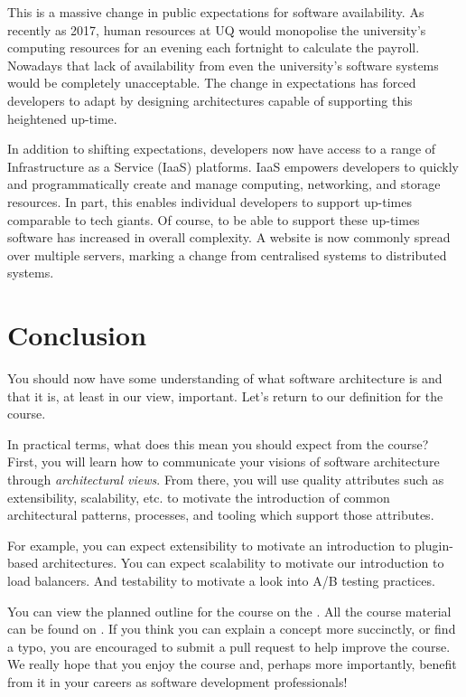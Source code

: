 This is a massive change in public expectations for software availability.
As recently as 2017, human resources at UQ would monopolise the university's computing resources for an evening each fortnight to calculate the payroll.
Nowadays that lack of availability from even the university's software systems would be completely unacceptable.
The change in expectations has forced developers to adapt by designing architectures capable of supporting this heightened up-time.

In addition to shifting expectations, developers now have access to a range of Infrastructure as a Service (IaaS) platforms.
IaaS empowers developers to quickly and programmatically create and manage computing, networking, and storage resources.
In part, this enables individual developers to support up-times comparable to tech giants.
Of course, to be able to support these up-times software has increased in overall complexity.
A website is now commonly spread over multiple servers, marking a change from centralised systems to distributed systems.

\section{Conclusion}

You should now have some understanding of what software architecture is and that it is, at least in our view, important.
Let's return to our definition for the course.

\coursedef*

In practical terms, what does this mean you should expect from the course?
First, you will learn how to communicate your visions of software architecture through \textsl{architectural views}.
From there, you will use quality attributes such as extensibility, scalability, etc.
to motivate the introduction of common architectural patterns, processes, and tooling which support those attributes.

For example, you can expect extensibility to motivate an introduction to plugin-based architectures.
You can expect scalability to motivate our introduction to load balancers.
And testability to motivate a look into A/B testing practices.


You can view the planned outline for the course on the .
All the course material can be found on .
If you think you can explain a concept more succinctly, or find a typo, you are encouraged to submit a pull request to help improve the course.
We really hope that you enjoy the course and, perhaps more importantly, benefit from it in your careers as software development professionals!